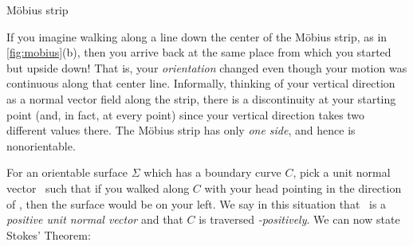 \noindent\begin{minipage}[t]{\linewidth}\noindent%
\captionsetup{type=figure}%
 \caption{M\"{o}bius strip}
 \label{fig:mobius}
\end{minipage}

If you imagine walking along a line down the center of the M\"{o}bius strip, as in \autoref{fig:mobius}(b), then you arrive back at the same place from which you started but upside down! That is, your \emph{orientation} changed even though your motion was continuous along that center line. Informally, thinking of your vertical direction as a normal vector field along the strip, there is a discontinuity at your starting point (and, in fact, at every point) since your vertical direction takes two different values there. The M\"{o}bius strip has only \emph{one side}, and hence is nonorientable.%

For an orientable surface $\Sigma$ which has a boundary curve $C$, pick a unit normal vector \vecn\ such that if you walked along $C$ with your head pointing in the direction of \vecn, then the surface would be on your left. We say in this situation that \vecn\ is a \emph{positive unit normal vector} and that $C$ is traversed \emph{\vecn-positively}. We can now state Stokes' Theorem:

